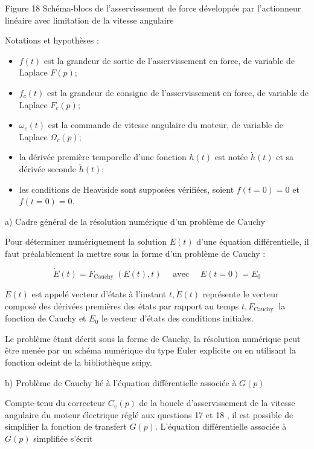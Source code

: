 \documentclass[10pt]{article}
\begin{document}
Figure 18 Schéma-blocs de l'asservissement de force développée par l'actionneur linéaire avec limitation de la vitesse angulaire

Notations et hypothèses :

\begin{itemize}
  \item $f(t)$ est la grandeur de sortie de l'asservissement en force, de variable de Laplace $F(p)$;

  \item $f_{c}(t)$ est la grandeur de consigne de l'asservissement en force, de variable de Laplace $F_{c}(p)$;

  \item $\omega_{c}(t)$ est la commande de vitesse angulaire du moteur, de variable de Laplace $\Omega_{c}(p)$;

  \item la dérivée première temporelle d'une fonction $h(t)$ est notée $\dot{h}(t)$ et sa dérivée seconde $\ddot{h}(t)$;

  \item les conditions de Heaviside sont supposées vérifiées, soient $f(t=0)=0$ et $\dot{f}(t=0)=0$.

\end{itemize}

a) Cadre général de la résolution numérique d'un problème de Cauchy

Pour déterminer numériquement la solution $E(t)$ d'une équation différentielle, il faut préalablement la mettre sous la forme d'un problème de Cauchy :

$$
\dot{E}(t)=F_{\text {Cauchy }}(E(t), t) \quad \text { avec } \quad E(t=0)=E_{0}
$$

$E(t)$ est appelé vecteur d'états à l'instant $t, \dot{E}(t)$ représente le vecteur composé des dérivées premières des états par rapport au temps $t, F_{\text {Cauchy }}$ la fonction de Cauchy et $E_{0}$ le vecteur d'états des conditions initiales.

Le problème étant décrit sous la forme de Cauchy, la résolution numérique peut être menée par un schéma numérique du type Euler explicite ou en utilisant la fonction odeint de la bibliothèque scipy.

b) Problème de Cauchy lié à l'équation différentielle associée à $G(p)$

Compte-tenu du correcteur $C_{v}(p)$ de la boucle d'asservissement de la vitesse angulaire du moteur électrique réglé aux questions 17 et 18 , il est possible de simplifier la fonction de transfert $G(p)$. L'équation différentielle associée à $G(p)$ simplifiée s'écrit
\end{document}

